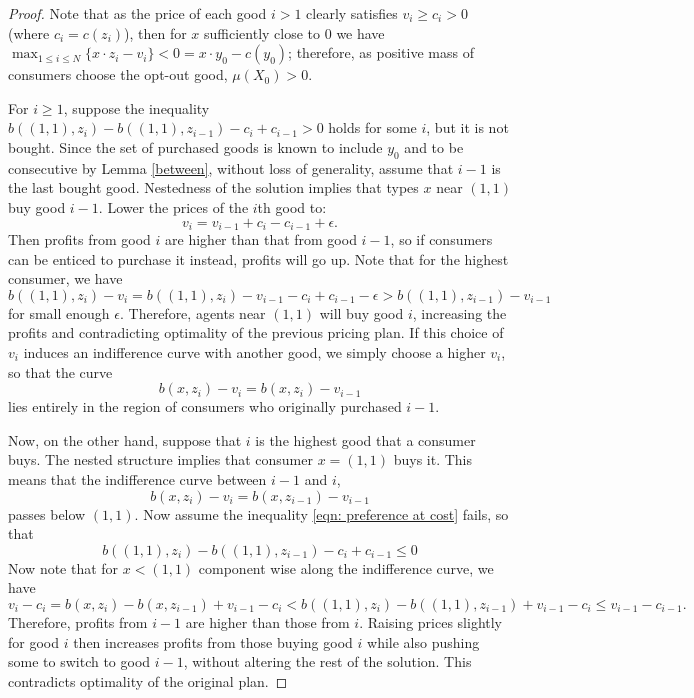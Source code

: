 \documentclass[12pt,reqno]{amsart}
\begin{document}
\begin{proof} Note that as the price of each good $i>1$ clearly satisfies $v_i \geq c_i>0$ (where $c_i=c(z_i)$), then for $x$ sufficiently close to $0$ we have $\max_{1\le i\le N}\{x\cdot z_i-v_i\}<0 =x\cdot y_0-c(y_0)$; therefore, as positive mass of consumers choose the opt-out good, $\mu(X_0) >0$.



       For $i \geq 1$, suppose the inequality  $b((1,1),z_{i}) -b((1,1),z_{i-1}) -c_{i}+c_{i-1} >0$ holds for some $i$, but it is not bought.  Since the set of purchased goods is known to include $y_0$ and to be consecutive by Lemma \ref{between}, without loss of generality, assume that $i-1$ is the last bought good.  Nestedness of the solution implies that types $x$ near $(1,1)$ buy good $i-1$.  Lower the prices of the $i$th good to: 
$$
v_i =v_{i-1} +c_i-c_{i-1} +\epsilon.
$$
Then profits from good $i$ are higher than that from good $i-1$, so if consumers can be enticed to purchase it instead, profits will go up.  Note that for the highest consumer, we have
$$
 b((1,1),z_{i}) -v_i = b((1,1),z_{i}) -v_{i-1} -c_i+c_{i-1} -\epsilon
 >
 b((1,1),z_{i-1}) -v_{i-1}
$$
for small enough $\epsilon$.  Therefore, agents near $(1,1)$ will buy good $i$, increasing the profits and contradicting optimality of the previous pricing plan.  If this choice of $v_i$ induces an indifference curve with another good, we simply choose a higher $v_i$, so that the curve
$$
 b(x,z_{i}) -v_i = b(x,z_{i}) -v_{i-1}
$$
lies entirely in the region of consumers who originally purchased $i-1$.

Now, on the other hand, suppose that $i$ is the highest good that a consumer buys.  The nested structure implies that consumer $x=(1,1)$ buys it.  This means that the indifference curve between $i-1$ and $i$,
$$
 b(x,z_{i}) -v_i = b(x,z_{i-1}) -v_{i-1}
$$
passes below $(1,1)$.  Now assume the inequality \eqref{eqn: preference at cost} fails, so that
$$
  b((1,1),z_{i}) -b((1,1),z_{i-1}) -c_{i}+c_{i-1} \leq 0
$$
Now note that for $x <(1,1)$ component wise along the indifference curve, we have
$$
v_i-c_i =b(x,z_i) -b(x,z_{i-1})+ v_{i-1}-c_i < b((1,1), z_{i}) -b((1,1), z_{i-1})+ v_{i-1} -c_i \leq v_{i-1} -c_{i-1}.
$$
Therefore, profits from $i-1$ are higher than those from $i$.  Raising prices slightly for good $i$ then increases profits from those buying good $i$ while also pushing some to switch to good $i-1$, without altering the rest of the solution. This contradicts optimality of the original plan.
\end{proof}
\end{document}
